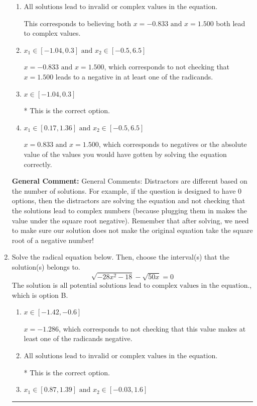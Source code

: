 \documentclass{extbook}[14pt]
\newcommand{\litem}[1]{\item #1

\rule{\textwidth}{0.4pt}}
\begin{document}
\begin{enumerate}
{\begin{enumerate}[label=\Alph*.]
$x = 1.500$, which corresponds to thinking this value does not make either radicand negative AND the value $x = -0.833$ does.
\item \( \text{All solutions lead to invalid or complex values in the equation.} \)

This corresponds to believing both $x = -0.833 \text{ and } x = 1.500$ both lead to complex values.
\item \( x_1 \in [-1.04, 0.3] \text{ and } x_2 \in [-0.5,6.5] \)

$x = -0.833 \text{ and } x = 1.500$, which corresponds to not checking that $x = 1.500$ leads to a negative in at least one of the radicands.
\item \( x \in [-1.04,0.3] \)

* This is the correct option.
\item \( x_1 \in [0.17, 1.36] \text{ and } x_2 \in [-0.5,6.5] \)

$x = 0.833 \text{ and } x = 1.500$, which corresponds to negatives or the absolute value of the values you would have gotten by solving the equation correctly.
\end{enumerate}

\textbf{General Comment:} General Comments: Distractors are different based on the number of solutions. For example, if the question is designed to have 0 options, then the distractors are solving the equation and not checking that the solutions lead to complex numbers (because plugging them in makes the value under the square root negative). Remember that after solving, we need to make sure our solution does not make the original equation take the square root of a negative number!
}
\litem{
Solve the radical equation below. Then, choose the interval(s) that the solution(s) belongs to.
\[ \sqrt{-28 x^2 - 18} - \sqrt{50 x} = 0 \]
The solution is \( \text{all potential solutions lead to complex values in the equation.} \), which is option B.\begin{enumerate}[label=\Alph*.]
\item \( x \in [-1.42,-0.6] \)

$x = -1.286$, which corresponds to not checking that this value makes at least one of the radicands negative.
\item \( \text{All solutions lead to invalid or complex values in the equation.} \)

* This is the correct option.
\item \( x_1 \in [0.87, 1.39] \text{ and } x_2 \in [-0.03,1.6] \)


\end{enumerate}}
\end{enumerate}
\end{document}
